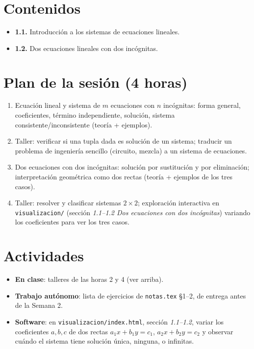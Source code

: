\documentclass[11pt,letterpaper]{article}
\begin{document}
\section{Contenidos}

\begin{itemize}[leftmargin=1.2cm]
  \item \textbf{1.1.} Introducción a los sistemas de ecuaciones lineales.
  \item \textbf{1.2.} Dos ecuaciones lineales con dos incógnitas.
\end{itemize}

\section{Plan de la sesión (4 horas)}

\begin{enumerate}[leftmargin=1.2cm]
  \item[\textbf{Hora 1.}] Ecuación lineal y sistema de $m$ ecuaciones con $n$ incógnitas: forma
        general, coeficientes, término independiente, solución, sistema consistente/inconsistente
        (teoría + ejemplos).
  \item[\textbf{Hora 2.}] Taller: verificar si una tupla dada es solución de un sistema;
        traducir un problema de ingeniería sencillo (circuito, mezcla) a un sistema de
        ecuaciones.
  \item[\textbf{Hora 3.}] Dos ecuaciones con dos incógnitas: solución por sustitución y por
        eliminación; interpretación geométrica como dos rectas (teoría + ejemplos de los tres
        casos).
  \item[\textbf{Hora 4.}] Taller: resolver y clasificar sistemas $2\times 2$; exploración
        interactiva en \texttt{visualizacion/} (sección \emph{1.1--1.2 Dos ecuaciones con dos
        incógnitas}) variando los coeficientes para ver los tres casos.
\end{enumerate}

\section{Actividades}

\begin{itemize}[leftmargin=1.2cm]
  \item \textbf{En clase}: talleres de las horas 2 y 4 (ver arriba).
  \item \textbf{Trabajo autónomo}: lista de ejercicios de \texttt{notas.tex} §1--2, de entrega
        antes de la Semana 2.
  \item \textbf{Software}: en \texttt{visualizacion/index.html}, sección \emph{1.1--1.2}, variar
        los coeficientes $a,b,c$ de dos rectas $a_1x+b_1y=c_1$, $a_2x+b_2y=c_2$ y observar cuándo
        el sistema tiene solución única, ninguna, o infinitas.
\end{itemize}
\end{document}
